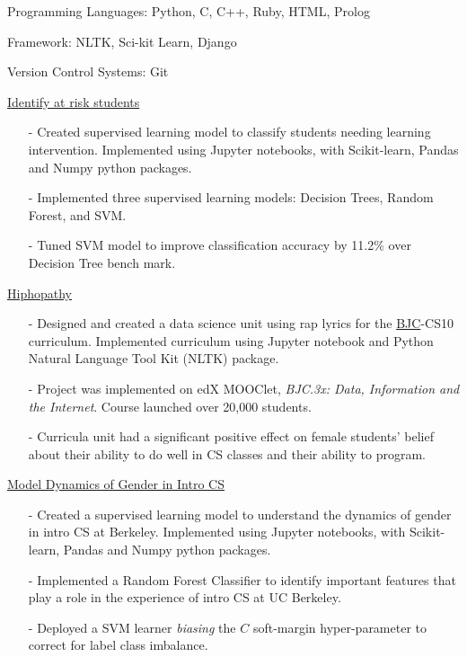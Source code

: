 \documentclass[11pt,article,oneside]{memoir}
\begin{document}
\medskip

\ind Programming Languages: Python, C, C++, Ruby, HTML, Prolog

\ind Framework: NLTK, Sci-kit Learn, Django

\ind Version Control Systems: Git

\bigskip 

\medskip

\ind \href{https://github.com/omoju/studentIntervention}{Identify at risk students}
\begin{itemize}[noitemsep,nolistsep]
\item[-] Created supervised learning model to classify students needing learning intervention. Implemented using Jupyter notebooks, with Scikit-learn, Pandas and Numpy python packages.
\item[-] Implemented three supervised learning models: Decision Trees, Random Forest, and SVM.
\item[-] Tuned SVM model to improve classification accuracy by 11.2\% over Decision Tree bench mark.
\end{itemize} 

\ind \href{https://github.com/omoju/hiphopathy}{Hiphopathy}
\begin{itemize}[noitemsep,nolistsep]
\item[-] Designed and created a data science unit using rap lyrics for the \href{http://bjc.berkeley.edu/}{BJC}-CS10 curriculum. Implemented curriculum using Jupyter notebook and Python Natural Language Tool Kit (NLTK) package.
\item[-] Project was implemented on edX MOOClet, \textit{BJC.3x: Data, Information and the Internet}. Course launched over 20,000 students.
\item[-] Curricula unit had a significant positive effect on female students' belief about their ability to do well in CS classes and their ability to program.
\end{itemize} 

\ind \href{https://github.com/omoju/DissertationDataAnalysis}{Model Dynamics of Gender in Intro CS}
\begin{itemize}[noitemsep,nolistsep]
\item[-] Created a supervised learning model to understand the dynamics of gender in intro CS at Berkeley. Implemented using Jupyter notebooks, with Scikit-learn, Pandas and Numpy python packages.
\item[-] Implemented a Random Forest Classifier to identify important features that play a role in the experience of intro CS at UC Berkeley.
\item[-] Deployed a SVM learner \textit{biasing} the $C$ soft-margin hyper-parameter to correct for label class imbalance.
\end{itemize} 
\end{document}
